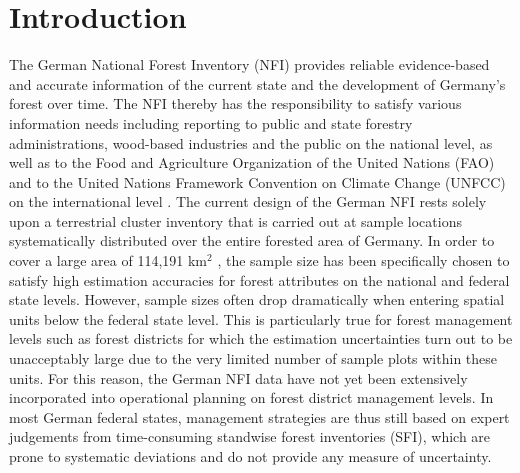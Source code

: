 \documentclass[remotesensing,article,accept,moreauthors,pdftex,10pt,a4paper]{Definitions/mdpi}
\begin{document}



\section{Introduction}
\label{sec:intro}

The German National Forest Inventory (NFI) provides reliable evidence-based and accurate information of the current state and the development of Germany's forest over time. The NFI thereby has the responsibility to satisfy various information needs including reporting to public and state forestry administrations, wood-based industries and the public on the national level, as well as to the Food and Agriculture Organization of the United Nations (FAO) and to the United Nations Framework Convention on Climate Change (UNFCC) on the international level \citep{polley2010intomppo}. The current design of the German NFI rests solely upon a terrestrial cluster inventory that is carried out at sample locations systematically distributed over the entire forested area of Germany. In order to cover a large area of 114,191 km$^2$ \citep{bwi3}, the sample size has been specifically chosen to satisfy high estimation accuracies for forest attributes on the national and federal state levels. However, sample sizes often drop dramatically when entering spatial units below the federal state level. This is particularly true for forest management levels such as forest districts for which the estimation uncertainties turn out to be unacceptably large due to the very limited number of sample plots within these units. For this reason, the German NFI data have not yet been extensively incorporated into operational planning on forest district management levels. In most German federal states, management strategies are thus still based on expert judgements from time-consuming standwise forest inventories (SFI), which are prone to systematic deviations \cite{kulievsis2016} and do not provide any measure of uncertainty.\par
\end{document}
